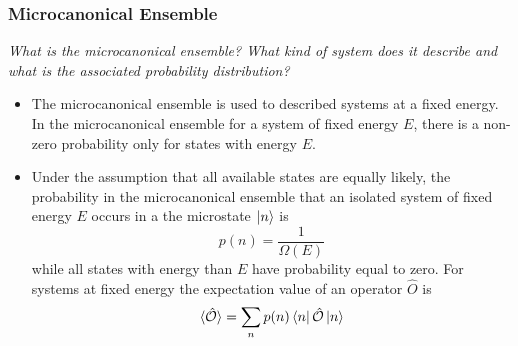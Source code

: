 \documentclass[11pt, a4paper]{article}
\begin{document}
\subsubsection{Microcanonical Ensemble}
\textit{What is the microcanonical ensemble? What kind of system does it describe and what is the associated probability distribution?}

\begin{itemize}

	\item The microcanonical ensemble is used to described systems at a fixed energy. In the microcanonical ensemble for a system of fixed energy $ E $, there is a non-zero probability only for states with energy $ E $. 
	
	\item Under the assumption that all available states are equally likely, the probability in the microcanonical ensemble that an isolated system of fixed energy $ E $ occurs in a the microstate $ \ket{n} $ is 
	\begin{equation*}
		p(n) = \frac{1}{\Omega(E)}
	\end{equation*}
	while all states with energy than $ E $ have probability equal to zero.	For systems at fixed energy the expectation value of an operator $ \hat{O} $ is 
	\begin{equation*}
		\langle \hat{\mathcal{O}} \rangle = \sum_{n}p(n)\bra{n}\hat{\mathcal{O}}\ket{n}
	\end{equation*}
\end{itemize}
\end{document}
